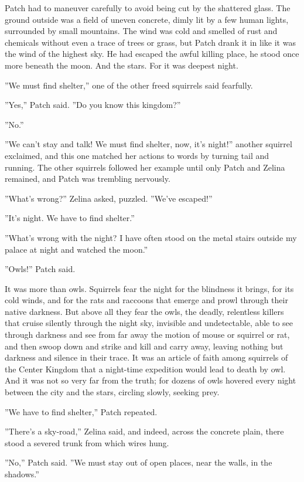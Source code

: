 \documentclass[12pt]{book}
\begin{document}
Patch had to maneuver carefully to avoid being cut by the shattered glass. The ground outside was a field of uneven concrete, dimly lit by a few human lights, surrounded by small mountains. The wind was cold and smelled of rust and chemicals without even a trace of trees or grass, but Patch drank it in like it was the wind of the highest sky. He had escaped the awful killing place, he stood once more beneath the moon. And the stars. For it was deepest night.

''We must find shelter,'' one of the other freed squirrels said fearfully.

''Yes,'' Patch said. ''Do you know this kingdom?''

''No.''

''We can't stay and talk! We must find shelter, now, it's night!'' another squirrel exclaimed, and this one matched her actions to words by turning tail and running. The other squirrels followed her example until only Patch and Zelina remained, and Patch was trembling nervously.

''What's wrong?'' Zelina asked, puzzled. ''We've escaped!''

''It's night. We have to find shelter.''

''What's wrong with the night? I have often stood on the metal stairs outside my palace at night and watched the moon.''

''Owls!'' Patch said.

It was more than owls. Squirrels fear the night for the blindness it brings, for its cold winds, and for the rats and raccoons that emerge and prowl through their native darkness. But above all they fear the owls, the deadly, relentless killers that cruise silently through the night sky, invisible and undetectable, able to see through darkness and see from far away the motion of mouse or squirrel or rat, and then swoop down and strike and kill and carry away, leaving nothing but darkness and silence in their trace. It was an article of faith among squirrels of the Center Kingdom that a night-time expedition would lead to death by owl. And it was not so very far from the truth; for dozens of owls hovered every night between the city and the stars, circling slowly, seeking prey.

''We have to find shelter,'' Patch repeated.

''There's a sky-road,'' Zelina said, and indeed, across the concrete plain, there stood a severed trunk from which wires hung.

''No,'' Patch said. ''We must stay out of open places, near the walls, in the shadows.''
\end{document}
